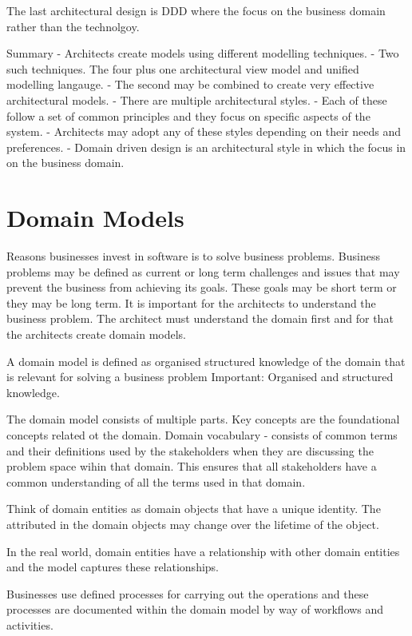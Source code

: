 The last architectural design is DDD where the focus on the business domain rather than the technolgoy.

Summary
- Architects create models using different modelling techniques.
- Two such techniques.
The four plus one architectural view model and unified modelling langauge.
- The second may be combined to create very effective architectural models.
- There are multiple architectural styles.
- Each of these follow a set of common principles and they focus on specific aspects of the system.
- Architects may adopt any of these styles depending on their needs and preferences.
- Domain driven design is an architectural style in which the focus in on the business domain.

\section{Domain Models}
Reasons businesses invest in software is to solve business problems.
Business problems may be defined as current or long term challenges and issues that may prevent the business from achieving its goals.
These goals may be short term or they may be long term.
It is important for the architects to understand the business problem.
The architect must understand the domain first and for that the architects create domain models.


A domain model is defined as organised structured knowledge of the domain that is relevant for solving a business problem
Important: Organised and structured knowledge.

The domain model consists of multiple parts.
Key concepts are the foundational concepts related ot the domain.
Domain vocabulary - consists of common terms and their definitions used by the stakeholders when they are discussing the problem space wihin that domain.
This ensures that all stakeholders have a common understanding of all the terms used in that domain.

Think of domain entities as domain objects that have a unique identity.
The attributed in the domain objects may change over the lifetime of the object.

In the real world, domain entities have a relationship with other domain entities and the model captures these relationships.

Businesses use defined processes for carrying out the operations and these processes are documented within the domain model by way of workflows and activities.

